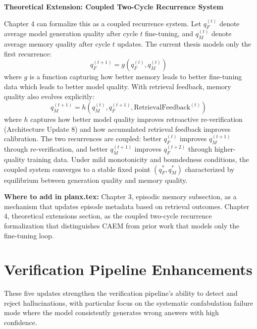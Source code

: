 \documentclass[11pt,a4paper]{article}
\begin{document}
{\textbf{Theoretical Extension: Coupled Two-Cycle Recurrence System}

Chapter 4 can formalize this as a coupled recurrence system. Let $q_F^{(t)}$ denote average model generation quality after cycle $t$ fine-tuning, and $q_M^{(t)}$ denote average memory quality after cycle $t$ updates. The current thesis models only the first recurrence:
\[
q_F^{(t+1)} = g(q_F^{(t)}, q_M^{(t)})
\]
where $g$ is a function capturing how better memory leads to better fine-tuning data which leads to better model quality. With retrieval feedback, memory quality also evolves explicitly:
\[
q_M^{(t+1)} = h(q_M^{(t)}, q_F^{(t+1)}, \text{RetrievalFeedback}^{(t)})
\]
where $h$ captures how better model quality improves retroactive re-verification (Architecture Update 8) and how accumulated retrieval feedback improves calibration. The two recurrences are coupled: better $q_F^{(t)}$ improves $q_M^{(t+1)}$ through re-verification, and better $q_M^{(t+1)}$ improves $q_F^{(t+2)}$ through higher-quality training data. Under mild monotonicity and boundedness conditions, the coupled system converges to a stable fixed point $(q_F^*, q_M^*)$ characterized by equilibrium between generation quality and memory quality.

\textbf{Where to add in planx.tex:} Chapter 3, episodic memory subsection, as a mechanism that updates episode metadata based on retrieval outcomes. Chapter 4, theoretical extensions section, as the coupled two-cycle recurrence formalization that distinguishes CAEM from prior work that models only the fine-tuning loop.
}

\newpage


\section{Verification Pipeline Enhancements}
\label{sec:verification}

These five updates strengthen the verification pipeline's ability to detect and reject hallucinations, with particular focus on the systematic confabulation failure mode where the model consistently generates wrong answers with high confidence.
\end{document}
